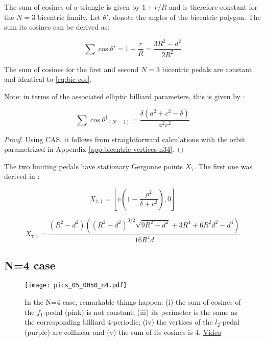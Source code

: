 The sum of cosines of a triangle is given by $1+r/R$ and is therefore constant for the $N=3$ bicentric family. Let $\theta'_i$ denote the angles of the bicentric polygon. The sum  its cosines can be derived as:

\begin{equation}
\sum\cos\theta' = 1+\frac{r}{R} = \frac{3R^2 - d^2}{2R^2}
\label{eq:bic-cos}
\end{equation}

\begin{proposition}
The sum of cosines for the first and second $N=3$ bicentric pedals are constant and identical to \eqref{eq:bic-cos}.
\end{proposition}

Note: in terms of the associated elliptic billiard parameters, this is given by \cite[Prop. 6]{reznik2020-n3-focus-inversive}:

\[\sum\cos{\theta^\dagger}_{(N=3)}=\frac{\delta (a^2+c^2-\delta)}{a^2c^2} \]


\begin{proof} Using CAS, it follows from  straightforward calculations with the orbit parametrized in Appendix \ref{app:bicentric-vertices-n34}.
\end{proof}

The two limiting pedals have stationary Gergonne points $X_7$. The first one was derived in \cite[Proposition 1]{garcia2020-self-intersected}:

\[ X_{7,1}=\left[c\left(1-\frac{\rho^2}{\delta+c^2}\right),0\right]  \]


\[X_{7,1} =\frac{ (R^2 - d^2)((R^2 - d^2)^{3/2}\sqrt{9R^2 - d^2} + 3R^4 + 6R^2d^2 - d^4)}{16R^4d}\]

\subsection{N=4 case}

\begin{figure}
    \centering
    \texttt{[image: pics\_05\_0050\_n4.pdf]}
    \caption{In the N=4 case, remarkable things happen: (i) the sum of cosines of the $f_1$-pedal (pink) is not constant; (iii) its perimeter is the same as the corresponding billiard 4-periodic; (iv) the vertices of the $l_2$-pedal (purple) are collinear and (v) the sum of its cosines is 4. \href{https://youtu.be/fZe6elRTfeA}{Video}}
    \label{fig:n4}
\end{figure}

